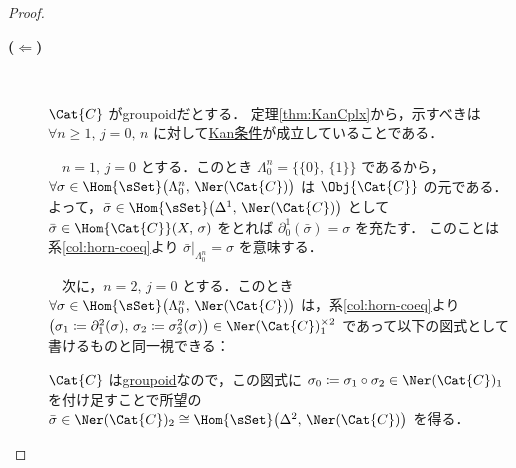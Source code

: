 \documentclass[TQFT_main]{subfiles}
\begin{document}
\begin{proof}
\begin{description}
        \item[\textbf{($\bm{\Longleftarrow}$)}]　
        
        $\Cat{C}$ がgroupoidだとする．
        定理\ref{thm:KanCplx}から，示すべきは $\forall n \ge 1,\, j = 0,\, n$ に対して\hyperref[def:KanCplx]{Kan条件}が成立していることである．
        
        　$n=1,\, j=0$ とする．このとき $\Lambda^n_0 = \bigl\{ \{0\},\, \{1\} \bigr\}$ であるから，
        $\forall \sigma \in \Hom{\sSet}\bigl( \Lambda^n_0,\, \Ner (\Cat{C}) \bigr)$ は $\Obj{\Cat{C}}$ の元である．よって，$\bar{\sigma} \in \Hom{\sSet}\bigl(\Delta^1,\, \Ner (\Cat{C})\bigr)$ として $\bar{\sigma} \in \Hom{\Cat{C}}(X,\, \sigma)$ をとれば $\partial^1_0(\bar{\sigma}) = \sigma$ を充たす．
        このことは系\ref{col:horn-coeq}より $\bar{\sigma}|_{\Lambda^n_0} = \sigma$ を意味する．

        　次に，$n=2,\, j=0$ とする．このとき $\forall \sigma \in \Hom{\sSet}\bigl( \Lambda^n_0,\, \Ner (\Cat{C}) \bigr)$ は，系\ref{col:horn-coeq}より $\bigl(\sigma_1 \coloneqq \partial^2_1(\sigma),\, \sigma_2 \coloneqq \sigma^2_2(\sigma)\bigr) \in \Ner (\Cat{C})_{1}^{\times 2}$ であって以下の図式として書けるものと同一視できる：
        \begin{center}
        \end{center}
        $\Cat{C}$ は\hyperref[def:groupoid]{groupoid}なので，この図式に $\sigma_0 \coloneqq \sigma_1 \circ \sigma_2 \in \Ner (\Cat{C})_1$ を付け足すことで所望の $\bar{\sigma} \in \Ner (\Cat{C})_2 \cong \Hom{\sSet} \bigl(\Delta^2,\, \Ner (\Cat{C})\bigr)$ を得る．


\end{description}
\end{proof}
\end{document}

